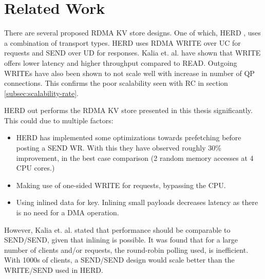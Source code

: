 
\chapter{Related Work}\label{ch:related-work} %



\ifpdf
    \graphicspath{{7/figures/PNG/}{7/figures/PDF/}{7/figures/}}
\else
    \graphicspath{{7/figures/EPS/}{7/figures/}}
\fi


%

There are several proposed RDMA KV store designs.
One of which, HERD \cite{kalia2014using}, uses a combination of transport types.
HERD uses RDMA WRITE over UC for requests and SEND over UD for responses.
Kalia et. al. have shown that WRITE offers lower latency and higher throughput compared to READ.
Outgoing WRITEs have also been shown to not scale well with increase in number of QP connections.
This confirms the poor scalability seen with RC in section \ref{subsec:scalability-rate}.

HERD out performs the RDMA KV store presented in this thesis significantly.
This could due to multiple factors:
\begin{itemize}
    \item HERD has implemented some optimizations towards prefetching before posting a SEND WR.
    With this they have observed roughly 30\% improvement, in the best case comparison (2 random memory accesses at 4 CPU cores.)
    \item Making use of one-sided WRITE for requests, bypassing the CPU.
    \item Using inlined data for key.
    Inlining small payloads decreases latency as there is no need for a DMA operation.
\end{itemize}

However, Kalia et. al. stated that performance should be comparable to SEND/SEND, given that inlining is possible.
It was found that for a large number of clients and/or requests, the round-robin polling used, is inefficient.
With 1000s of clients, a SEND/SEND design would scale better than the WRITE/SEND used in HERD.





